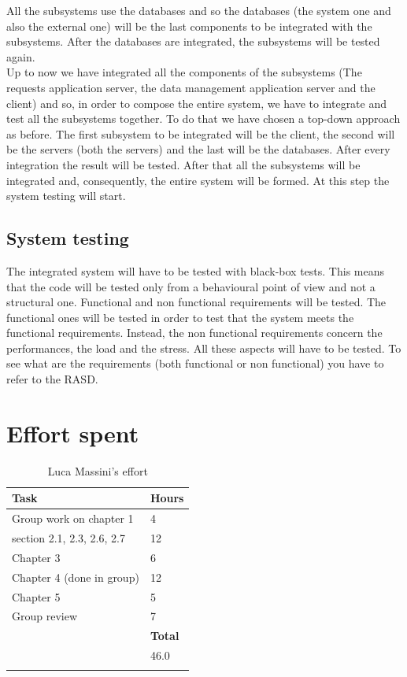 \documentclass[titlepage]{article}
\begin{document}
All the subsystems use the databases and so the databases (the system one and also the external one) will be the last components to be integrated with the subsystems. After the databases are integrated, the subsystems will be tested again.\\

Up to now we have integrated all the components of the subsystems (The requests application server, the data management application server and the client) and so, in order to compose the entire system, we have to integrate and test all the subsystems together. To do that we have chosen a top-down approach as before. The first subsystem to be integrated will be the client, the second will be the servers (both the servers) and the last will be the databases. After every integration the result will be tested. After that all the subsystems will be integrated and, consequently, the entire system will be formed. At this step the system testing will start.

\subsection{System testing}
The integrated system will have to be tested with black-box tests. This means that the code will be tested only from a behavioural point of view and not a structural one. Functional and non functional requirements will be tested. The functional ones will be tested in order to test that the system meets the functional requirements. Instead, the non functional requirements concern the performances, the load and the stress. All these aspects will have to be tested. To see what are the requirements (both functional or non functional) you have to refer to the RASD. 
\newpage
\section{Effort spent}
\begin{longtable}{| p{12 cm} | p{2 cm} |} 
		\hline
		{\bf Task} & {\bf Hours}\\
		\hline
		 Group work on chapter 1 &  4\\
		 section 2.1, 2.3, 2.6, 2.7 & 12 \\
		 Chapter 3 & 6 \\
		 Chapter 4 (done in group) & 12 \\
		 Chapter 5 & 5 \\
		 Group review  & 7 \\
		\hline
		&  {\bf Total} \\
		\hline
		&  46.0 \\
		\hline
		\caption{Luca Massini's effort}
	\end{longtable}
	
\end{document}
